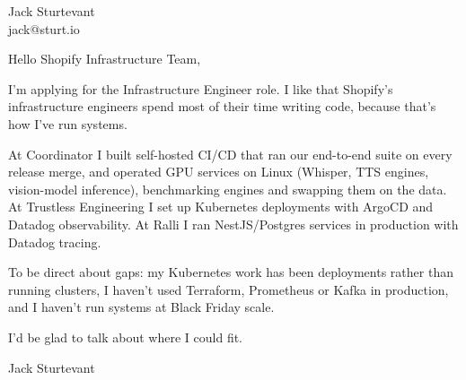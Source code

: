 \documentclass[11pt]{article}
\begin{document}
\raggedright

{\namefont\fontsize{20pt}{24pt}\selectfont Jack Sturtevant}\\[-0.3em]
jack@sturt.io

\vspace{1.2em}

Hello Shopify Infrastructure Team,

I'm applying for the Infrastructure Engineer role. I like that Shopify's infrastructure engineers spend most of their time writing code, because that's how I've run systems.

At Coordinator I built self-hosted CI/CD that ran our end-to-end suite on every release merge, and operated GPU services on Linux (Whisper, TTS engines, vision-model inference), benchmarking engines and swapping them on the data. At Trustless Engineering I set up Kubernetes deployments with ArgoCD and Datadog observability. At Ralli I ran NestJS/Postgres services in production with Datadog tracing.

To be direct about gaps: my Kubernetes work has been deployments rather than running clusters, I haven't used Terraform, Prometheus or Kafka in production, and I haven't run systems at Black Friday scale.

I'd be glad to talk about where I could fit.

\vspace{0.6em}
Jack Sturtevant
\end{document}
